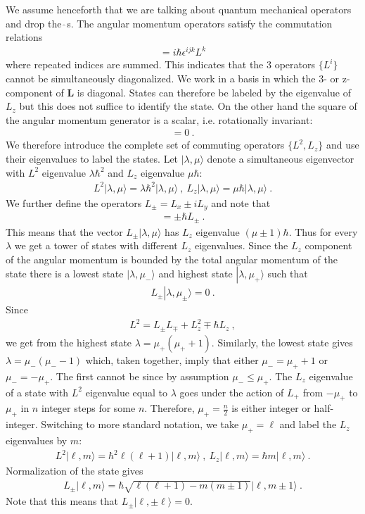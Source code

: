 \documentclass[12pt]{article}
\def\ket#1{\left| #1\rangle\right.}
\begin{document}
We assume henceforth that we are talking about quantum mechanical operators and drop the $\hat{~}$s. The angular momentum operators satisfy the commutation relations 
\begin{eqnarray}
[L^i, L^j]=i\hbar \epsilon^{ijk}L^k
\end{eqnarray}
where repeated indices are summed. This indicates that the 3 operators $\{ L^i\}$ cannot be simultaneously diagonalized. We work in a basis in which the 3- or z-component of $\mathbf L$ is diagonal. States can therefore be labeled by the eigenvalue of $L_z$ but this does not suffice to identify the state. On the other hand the square of the angular momentum generator is a scalar, i.e. rotationally invariant:
\begin{eqnarray}
[L^2, L_z]=0~.
\end{eqnarray}
We therefore introduce the complete set of commuting operators $\{L^2 , L_z\}$ and use their eigenvalues to label the states. Let $\ket{\lambda, \mu}$ denote a simultaneous eigenvector with $L^2$ eigenvalue $\lambda \hbar^2$ and $L_z$ eigenvalue $\mu \hbar$: 
\begin{eqnarray}
L^2\ket {\lambda, \mu}=\lambda \hbar^2\ket {\lambda, \mu}~,~L_z\ket {\lambda, \mu}=\mu \hbar \ket {\lambda, \mu}~.
\end{eqnarray}
We further define the operators $L_\pm=L_x\pm i L_y$ and note that 
\begin{eqnarray}
[L_z, L_\pm]= \pm \hbar L_\pm~.
\end{eqnarray}
This means that the vector $L_\pm \ket {\lambda, \mu}$ has $L_z$ eigenvalue $(\mu\pm 1)\hbar$. Thus for every $\lambda$ we get a tower of states with different $L_z$ eigenvalues. Since the $L_z$ component of the angular momentum is bounded by the total angular momentum of the state there is a lowest state $\ket{\lambda,\mu_-}$ and highest state $\ket{\lambda,\mu_+}$ such that
\begin{eqnarray}
L_\pm \ket{\lambda,\mu_\pm} =0~.
\end{eqnarray}
Since
\begin{eqnarray}
L^2=L_\pm L_\mp+L_z^2\mp \hbar L_z~,
\end{eqnarray}
we get from the highest state $\lambda =\mu_+(\mu_++1)$. Similarly, the lowest state gives $\lambda=\mu_-(\mu_--1)$ which, taken together, imply that either $\mu_-=\mu_+ +1$ or $\mu_-=-\mu_+$. The first cannot be since by assumption $\mu_-\leq \mu_+$. The $L_z$ eigenvalue of a state with $L^2$ eigenvalue equal to $\lambda$ goes under the action of $L_+$ from $-\mu_+$ to $\mu_+$ in $n$ integer steps for some $n$. Therefore, $\mu_+=\frac n2$ is either integer or half-integer. Switching to more standard notation, we take $\mu_+ = \ell$ and label the $L_z$ eigenvalues by $m$:
\begin{eqnarray}
L^2\ket{\ell, m}=\hbar^2 \ell(\ell+1)\ket{\ell, m}~,~L_z\ket{\ell, m}=\hbar m \ket{\ell,m}~.
\end{eqnarray}
Normalization of the state gives
\begin{eqnarray}
L_\pm\ket{\ell, m}=\hbar \sqrt{\ell(\ell+1)-m(m\pm1)}\ket{\ell, m\pm1}~.
\end{eqnarray}
Note that this means that $L_\pm\ket{\ell, \pm\ell}=0$.
\end{document}
